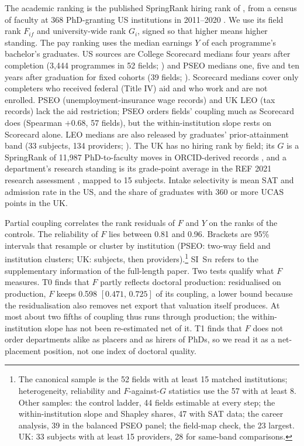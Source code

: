 \documentclass[11pt]{article}
\newcommand{\ci}[2]{$[#1,\allowbreak\,#2]$}
\begin{document}
The academic ranking is the published SpringRank hiring rank of \citet{wapman2022quantifying}, from a census of
faculty at 368 PhD-granting US institutions in 2011--2020 \citep{wapman2022data}. We use its field rank $F_{if}$ and
university-wide rank $G_i$, signed so that higher means higher standing. The pay ranking uses the median earnings $Y$
of each programme's bachelor's graduates. US sources are College Scorecard medians four years after completion (3,444
programmes in 52 fields; \citealp{scorecard}) and PSEO medians one, five and ten years after graduation for fixed
cohorts (39 fields; \citealp{pseo, pseo2026}). Scorecard medians cover only completers who received federal (Title
IV) aid and who work and are not enrolled. PSEO (unemployment-insurance wage records) and UK LEO (tax records) lack
the aid restriction; PSEO orders fields' coupling much as Scorecard does (Spearman $+0.68$, 57 fields), but the
within-institution slope rests on Scorecard alone. LEO medians are also released by graduates' prior-attainment band
(33 subjects, 134 providers; \citealp{dfe_leo_provider}). The UK has no hiring rank by field; its $G$ is a SpringRank
of 11,987 PhD-to-faculty moves in ORCID-derived records \citep{li2026orcid}, and a department's research standing is
its grade-point average in the REF 2021 research assessment \citep{ref2021results}, mapped to 15 subjects. Intake
selectivity is mean SAT and admission rate in the US, and the share of graduates with 360 or more UCAS points in the
UK.

Partial coupling correlates the rank residuals of $F$ and $Y$ on the ranks of the controls. The reliability of $F$
lies between 0.81 and 0.96. Brackets are 95\% intervals that resample or cluster by institution (PSEO: two-way field
and institution clusters; UK: subjects, then providers).\footnote{The canonical sample is the 52 fields with at least
15 matched institutions; heterogeneity, reliability and $F$-against-$G$ statistics use the 57 with at least 8. Other
samples: the control ladder, 44 fields estimable at every step; the within-institution slope and Shapley shares, 47
with SAT data; the career analysis, 39 in the balanced PSEO panel; the field-map check, the 23 largest. UK: 33
subjects with at least 15 providers, 28 for same-band comparisons.} SI~S$n$ refers to the supplementary information
of the full-length paper. Two tests qualify what $F$ measures. T0 finds that $F$ partly reflects doctoral production:
residualised on production, $F$ keeps 0.598 \ci{0.471}{0.725} of its coupling, a lower bound because the
residualisation also removes net export that valuation itself produces. At most about two fifths of coupling thus
runs through production; the within-institution slope has not been re-estimated net of it. T1 finds that $F$ does not
order departments alike as placers and as hirers of PhDs, so we read it as a net-placement position, not one index of
doctoral quality.
\end{document}
